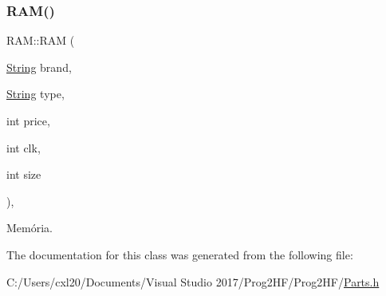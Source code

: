 \subsubsection{\texorpdfstring{RAM()}{RAM()}}
{\footnotesize\ttfamily R\+A\+M\+::\+R\+AM (\begin{DoxyParamCaption}\item[{\mbox{\hyperlink{class_string}{String}}}]{brand,  }\item[{\mbox{\hyperlink{class_string}{String}}}]{type,  }\item[{int}]{price,  }\item[{int}]{clk,  }\item[{int}]{size }\end{DoxyParamCaption})\hspace{0.3cm}{\ttfamily [inline]}, {\ttfamily [explicit]}}



Memória. 



The documentation for this class was generated from the following file\+:\begin{DoxyCompactItemize}
\item 
C\+:/\+Users/cxl20/\+Documents/\+Visual Studio 2017/\+Prog2\+H\+F/\+Prog2\+H\+F/\mbox{\hyperlink{_parts_8h}{Parts.\+h}}\end{DoxyCompactItemize}
